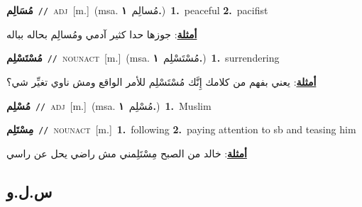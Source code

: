 \documentclass[10pt,a4paper,twoside]{article} %
\begin{document}
\begin{multicols}{2}
{\setlength\topsep{0pt}\textbf{\foreignlanguage{arabic}{مُسَالِم}}\ {\color{gray}\texttt{//}\color{black}}\ \textsc{adj}\ [m.]\ \color{gray}(msa. \foreignlanguage{arabic}{مُسالِم}~\foreignlanguage{arabic}{\textbf{١.}})\color{black}\ \textbf{1.}~peaceful  \textbf{2.}~pacifist\  \begin{flushright}\color{gray}\foreignlanguage{arabic}{\textbf{\underline{\foreignlanguage{arabic}{أمثلة}}}: جوزها حدا كثير آدمي ومُسالِم بحاله بباله}\end{flushright}\color{black}} \vspace{2mm}

{\setlength\topsep{0pt}\textbf{\foreignlanguage{arabic}{مُسْتَسْلِم}}\ {\color{gray}\texttt{//}\color{black}}\ \textsc{noun\textunderscore act}\ [m.]\ \color{gray}(msa. \foreignlanguage{arabic}{مُسْتَسْلِم}~\foreignlanguage{arabic}{\textbf{١.}})\color{black}\ \textbf{1.}~surrendering\  \begin{flushright}\color{gray}\foreignlanguage{arabic}{\textbf{\underline{\foreignlanguage{arabic}{أمثلة}}}: يعني بفهم من كلامك إِنَّك مُسْتَسْلِم للأمر الواقع ومش ناوي تغيِّر شي؟}\end{flushright}\color{black}} \vspace{2mm}

{\setlength\topsep{0pt}\textbf{\foreignlanguage{arabic}{مُسْلِم}}\ {\color{gray}\texttt{//}\color{black}}\ \textsc{adj}\ [m.]\ \color{gray}(msa. \foreignlanguage{arabic}{مُسْلِم}~\foreignlanguage{arabic}{\textbf{١.}})\color{black}\ \textbf{1.}~Muslim\ } \vspace{2mm}

{\setlength\topsep{0pt}\textbf{\foreignlanguage{arabic}{مِسْتَلِم}}\ {\color{gray}\texttt{//}\color{black}}\ \textsc{noun\textunderscore act}\ [m.]\ \textbf{1.}~following  \textbf{2.}~paying attention to sb and teasing him\  \begin{flushright}\color{gray}\foreignlanguage{arabic}{\textbf{\underline{\foreignlanguage{arabic}{أمثلة}}}: خالد من الصبح مِسْتَلِمني مش راضي يحل عن راسي}\end{flushright}\color{black}} \vspace{2mm}

\vspace{-3mm}
\subsection*{\color{blue}\foreignlanguage{arabic}{س.ل.و}\color{blue}{}} 


\end{multicols}
\end{document}
